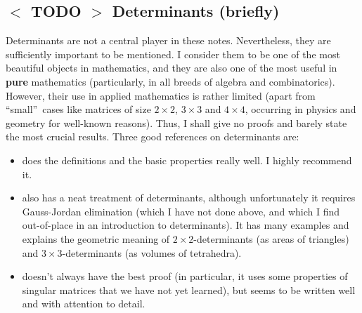 \documentclass[numbers=enddot,12pt,final,onecolumn,notitlepage]{scrartcl}%
\theoremstyle{definition}
\begin{document}
\subsection{%
$<$%
TODO%
$>$
Determinants (briefly)}

Determinants are not a central player in these notes. Nevertheless, they are
sufficiently important to be mentioned. I consider them to be one of the most
beautiful objects in mathematics, and they are also one of the most useful in
\textbf{pure} mathematics (particularly, in all breeds of algebra and
combinatorics). However, their use in applied mathematics is rather limited
(apart from \textquotedblleft small\textquotedblright\ cases like matrices of
size $2\times2$, $3\times3$ and $4\times4$, occurring in physics and geometry
for well-known reasons). Thus, I shall give no proofs and barely state the
most crucial results. Three good references on determinants are:

\begin{itemize}
\item \cite[Chapter 8]{LaNaSc16} does the definitions and the basic properties
really well. I highly recommend it.

\item \cite[Chapter Four]{Heffer16} also has a neat treatment of determinants,
although unfortunately it requires Gauss-Jordan elimination (which I have not
done above, and which I find out-of-place in an introduction to determinants).
It has many examples and explains the geometric meaning of $2\times
2$-determinants (as areas of triangles) and $3\times3$-determinants (as
volumes of tetrahedra).

\item \cite[Chapter 4]{BarSch73} doesn't always have the best proof (in
particular, it uses some properties of singular matrices that we have not yet
learned), but seems to be written well and with attention to detail.
\end{itemize}
\end{document}
